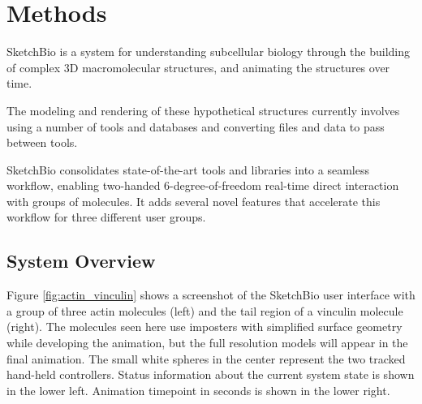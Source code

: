 \documentclass[twocolumn]{bmcart}%
\begin{document}
\section*{Methods}

SketchBio is a system for understanding subcellular biology through the building of complex 3D macromolecular structures, and animating the structures over time.

The modeling and rendering of these hypothetical structures currently involves using a number of tools and databases and converting files and data to pass between tools.

SketchBio consolidates state-of-the-art tools and libraries into a seamless workflow, enabling two-handed 6-degree-of-freedom real-time direct interaction with groups of molecules.
It adds several novel features that accelerate this workflow for three different user groups.

\subsection*{System Overview}

Figure \ref{fig:actin_vinculin} shows a screenshot of the SketchBio user interface with a group of three actin molecules (left) and the tail region of a vinculin molecule (right).
The molecules seen here use imposters with simplified surface geometry while developing the animation, but the full resolution models will appear in the final animation.
The small white spheres in the center represent the two tracked hand-held controllers. Status information about the current system state is shown in the lower left.
Animation timepoint in seconds is shown in the lower right.
\end{document}
